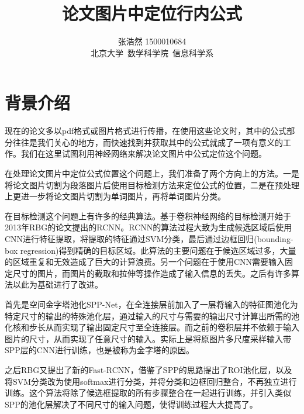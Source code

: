 \documentclass[12pt]{article}
\title{论文图片中定位行内公式}
\author{张浩然 1500010684 \\ 北京大学~数学科学院~信息科学系}
\date{}
\begin{document}


\maketitle
\tableofcontents

\newpage
{}

\section{背景介绍}
\noindent

现在的论文多以pdf格式或图片格式进行传播，在使用这些论文时，其中的公式部分往往是我们关心的地方，而快速找到并获取其中的公式就成了一项有意义的工作。我们在这里试图利用神经网络来解决论文图片中公式定位这个问题。

在处理论文图片中定位公式位置这个问题上，我们准备了两个方向上的方法。一是将论文图片切割为段落图片后使用目标检测方法来定位公式的位置，二是在预处理上更进一步将论文图片切割为单词图片，再将单词图片分类。

在目标检测这个问题上有许多的经典算法。基于卷积神经网络的目标检测开始于2013年RBG的论文\cite{rcnn}提出的RCNN。RCNN的算法过程大致为生成候选区域后使用CNN进行特征提取，将提取的特征通过SVM分类，最后通过边框回归(bounding-box regression)得到精确的目标区域。此算法的主要问题在于候选区域过多，大量的区域重复和无效造成了巨大的计算浪费。另一个问题在于使用CNN需要输入固定尺寸的图片，而图片的截取和拉伸等操作造成了输入信息的丢失。之后有许多算法以此为基础进行了改进。

首先是空间金字塔池化SPP-Net\cite{spp}，在全连接层前加入了一层将输入的特征图池化为特定尺寸的输出的特殊池化层，通过输入的尺寸与需要的输出尺寸计算出所需的池化核和步长从而实现了输出固定尺寸至全连接层。而之前的卷积层并不依赖于输入图片的尺寸，从而实现了任意尺寸的输入。实际上是将原图片多尺度采样输入带SPP层的CNN进行训练，也是被称为金字塔的原因。

之后RBG又提出了新的Fast-RCNN\cite{frcnn}，借鉴了SPP的思路提出了ROI池化层，以及将SVM分类改为使用softmax进行分类，并将分类和边框回归整合，不再独立进行训练。这个算法将除了候选框提取的所有步骤整合在一起进行训练，并引入类似SPP的池化层解决了不同尺寸的输入问题，使得训练过程大大提高了。
\end{document}
